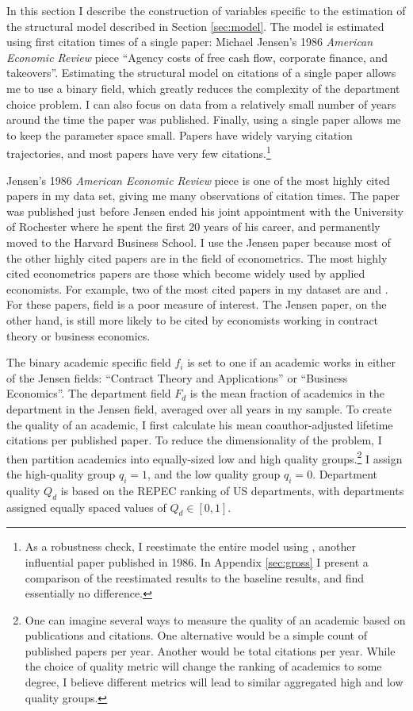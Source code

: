 \documentclass[]{article}
\begin{document}
In this section I describe the construction of variables specific to the estimation
of the structural model described in Section \ref{sec:model}.  The model is
estimated using first citation
times of a single paper: Michael Jensen's 1986 \emph{American Economic
Review} piece ``Agency costs of free cash
flow, corporate finance, and takeovers''.
Estimating the structural model on
citations of a single paper allows me to use a binary field,
which greatly reduces the complexity of the department choice problem.
I can also focus on data from a relatively small number of years around the time the paper
was published.  Finally, using a single paper allows me to keep the parameter 
space small.  Papers have widely varying citation trajectories, and most
papers have very few citations.\footnote{ As a robustness check, I reestimate the entire model using \citet{grossman1986costs},
    another influential paper published in 1986.  In Appendix \ref{sec:gross} I present a comparison of the reestimated results
 to the baseline results, and find essentially no difference.}

Jensen's 1986 \emph{American Economic Review} piece is one of the most highly
cited papers in my data set, giving me many observations of citation
times. The paper was published just before Jensen ended his joint
appointment with the University of Rochester where he spent the first 20
years of his career, and permanently moved to the Harvard Business
School. I use the Jensen paper because most of the other highly cited papers 
are in the field of econometrics. The most highly cited econometrics papers are those 
which become widely used by applied economists.  For example, two of the most cited
papers in my dataset are \citet{heckman1979sample} and \citet{white1980heteroskedasticity}.
 For these papers, field is a poor measure of interest.  The Jensen paper, on the
 other hand, is still more likely to be cited by economists working in contract theory or business
economics.

The binary academic specific
field $f_i$ is set to one if an academic works in
either of the Jensen fields: ``Contract Theory and Applications'' or ``Business Economics''.
The department field $F_d$ is the mean fraction of academics in the department in the 
Jensen field, averaged over all years in my sample.  To create the quality of an academic, I
first calculate his mean coauthor-adjusted lifetime citations per published paper. To reduce the
dimensionality of the problem, I then partition academics into equally-sized
low and high quality groups.\footnote{One can imagine
several ways to measure the quality of an academic based on publications and citations.
One alternative would be a simple count of published papers per year.  Another would be
total citations per year.  While the choice of quality metric will change the
ranking of academics to some degree, I believe different metrics will lead to
similar aggregated high and low quality groups.}  I assign the high-quality group $q_i = 1$, 
and the low quality group $q_i = 0$.  Department quality $Q_d$ is based on the REPEC ranking
of US departments, with departments assigned equally spaced values of $Q_d \in [0,1]$.
\end{document}
